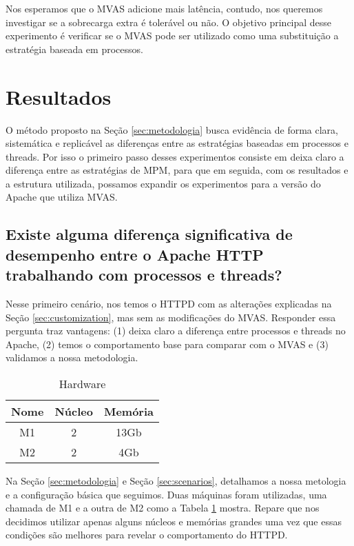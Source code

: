 

Nos esperamos que o MVAS adicione mais latência, contudo, nos queremos
investigar se a sobrecarga extra é tolerável ou não. O objetivo principal desse
experimento é verificar se o MVAS pode ser utilizado como uma substituição a
estratégia baseada em processos.

\section{Resultados}
\label{sec:preliminary}

O método proposto na Seção \ref{sec:metodologia} busca evidência de forma
clara, sistemática e replicável as diferenças entre as estratégias baseadas em
processos e threads. Por isso o primeiro passo desses experimentos consiste em
deixa claro a diferença entre as estratégias de MPM, para que em seguida, com
os resultados e a estrutura utilizada, possamos expandir os experimentos para a
versão do Apache que utiliza MVAS.

\subsection{Existe alguma diferença significativa de desempenho entre o Apache HTTP trabalhando com processos e threads?}

Nesse primeiro cenário, nos temos o HTTPD com as alterações explicadas na Seção
\ref{sec:customization}, mas sem as modificações do MVAS. Responder essa
pergunta traz vantagens: (1) deixa claro a diferença entre processos e
threads no Apache, (2) temos o comportamento base para comparar com o MVAS e
(3) validamos a nossa metodologia.

\begin{table}[h!]
  \centering
  \begin{tabular}{|c|c|c|}
    \hline
    Nome & \textbf{Núcleo} & \textbf{Memória}\\
    \hline
    M1 & 2 & 13Gb \\
    \hline
    M2 & 2 & 4Gb \\
    \hline
  \end{tabular}
  \caption{Hardware}
  \label{tab:machines}
\end{table}

Na Seção \ref{sec:metodologia} e Seção \ref{sec:scenarios}, detalhamos a nossa
metologia e a configuração básica que seguimos. Duas máquinas foram utilizadas,
uma chamada de M1 e a outra de M2 como a Tabela \ref{tab:machines} mostra.
Repare que nos decidimos utilizar apenas alguns núcleos e memórias grandes uma
vez que essas condições são melhores para revelar o comportamento do HTTPD.

